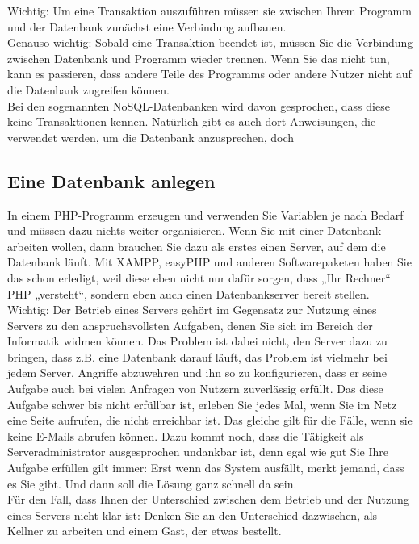 Wichtig: Um eine Transaktion auszuführen müssen sie zwischen Ihrem Programm und der Datenbank zunächst eine Verbindung aufbauen.\\

Genauso wichtig: Sobald eine Transaktion beendet ist, müssen Sie die Verbindung zwischen Datenbank und Programm wieder trennen. Wenn Sie das nicht tun, kann es passieren, dass andere Teile des Programms oder andere Nutzer nicht auf die Datenbank zugreifen können.\\

Bei den sogenannten NoSQL-Datenbanken wird davon gesprochen, dass diese keine Transaktionen kennen. Natürlich gibt es auch dort Anweisungen, die verwendet werden, um die Datenbank anzusprechen, doch 

\subsection{Eine Datenbank anlegen}

In einem PHP-Programm erzeugen und verwenden Sie Variablen je nach Bedarf und müssen dazu nichts weiter organisieren. Wenn Sie mit einer Datenbank arbeiten wollen, dann brauchen Sie dazu als erstes einen Server, auf dem die Datenbank läuft. Mit XAMPP, easyPHP und anderen Softwarepaketen haben Sie das schon erledigt, weil diese eben nicht nur dafür sorgen, dass „Ihr Rechner“ PHP „versteht“, sondern eben auch einen Datenbankserver bereit stellen.\\

Wichtig: Der Betrieb eines Servers gehört im Gegensatz zur Nutzung eines Servers zu den anspruchsvollsten Aufgaben, denen Sie sich im Bereich der Informatik widmen können. Das Problem ist dabei nicht, den Server dazu zu bringen, dass z.B. eine Datenbank darauf läuft, das Problem ist vielmehr bei jedem Server, Angriffe abzuwehren und ihn so zu konfigurieren, dass er seine Aufgabe auch bei vielen Anfragen von Nutzern zuverlässig erfüllt. Das diese Aufgabe schwer bis nicht erfüllbar ist, erleben Sie jedes Mal, wenn Sie im Netz eine Seite aufrufen, die nicht erreichbar ist. Das gleiche gilt für die Fälle, wenn sie keine E-Mails abrufen können. Dazu kommt noch, dass die Tätigkeit als Serveradministrator ausgesprochen undankbar ist, denn egal wie gut Sie Ihre Aufgabe erfüllen gilt immer: Erst wenn das System ausfällt, merkt jemand, dass es Sie gibt. Und dann soll die Lösung ganz schnell da sein.\\

Für den Fall, dass Ihnen der Unterschied zwischen dem Betrieb und der Nutzung eines Servers nicht klar ist: Denken Sie an den Unterschied dazwischen, als Kellner zu arbeiten und einem Gast, der etwas bestellt.\\

